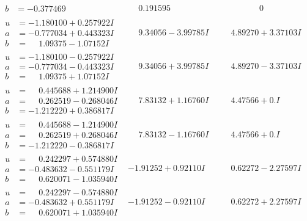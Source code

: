 \documentclass[1p]{elsarticle_modified}
\theoremstyle{definition}
\begin{document}
$$\begin{array}{c|c|c}
\begin{aligned}
b &= -0.377469\phantom{ +0.000000I}\end{aligned}
 & \phantom{-}0.191595\phantom{ +0.000000I} & \phantom{-0.000000 } 0 \\ \hline\begin{aligned}
u &= -1.180100 + 0.257922 I \\
a &= -0.777034 + 0.443323 I \\
b &= \phantom{-}1.09375 - 1.07152 I\end{aligned}
 & \phantom{-}9.34056 - 3.99785 I & \phantom{-}4.89270 + 3.37103 I \\ \hline\begin{aligned}
u &= -1.180100 - 0.257922 I \\
a &= -0.777034 - 0.443323 I \\
b &= \phantom{-}1.09375 + 1.07152 I\end{aligned}
 & \phantom{-}9.34056 + 3.99785 I & \phantom{-}4.89270 - 3.37103 I \\ \hline\begin{aligned}
u &= \phantom{-}0.445688 + 1.214900 I \\
a &= \phantom{-}0.262519 - 0.268046 I \\
b &= -1.212220 + 0.386817 I\end{aligned}
 & \phantom{-}7.83132 + 1.16760 I & \phantom{-}4.47566 + 0. I\phantom{ +0.000000I} \\ \hline\begin{aligned}
u &= \phantom{-}0.445688 - 1.214900 I \\
a &= \phantom{-}0.262519 + 0.268046 I \\
b &= -1.212220 - 0.386817 I\end{aligned}
 & \phantom{-}7.83132 - 1.16760 I & \phantom{-}4.47566 + 0. I\phantom{ +0.000000I} \\ \hline\begin{aligned}
u &= \phantom{-}0.242297 + 0.574880 I \\
a &= -0.483632 - 0.551179 I \\
b &= \phantom{-}0.620071 - 1.035940 I\end{aligned}
 & -1.91252 + 0.92110 I & \phantom{-}0.62272 - 2.27597 I \\ \hline\begin{aligned}
u &= \phantom{-}0.242297 - 0.574880 I \\
a &= -0.483632 + 0.551179 I \\
b &= \phantom{-}0.620071 + 1.035940 I\end{aligned}
 & -1.91252 - 0.92110 I & \phantom{-}0.62272 + 2.27597 I \\ \hline\begin{aligned}

\end{aligned}
\end{array}$$
\end{document}
